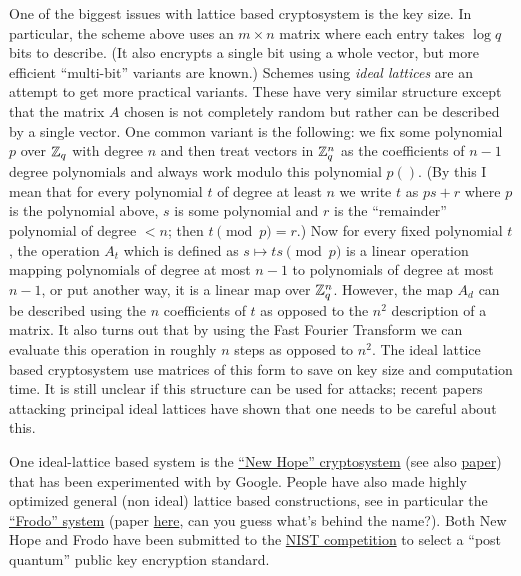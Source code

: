 One of the biggest issues with lattice based cryptosystem is the key
size. In particular, the scheme above uses an \(m\times n\) matrix where
each entry takes \(\log q\) bits to describe. (It also encrypts a single
bit using a whole vector, but more efficient ``multi-bit'' variants are
known.) Schemes using \emph{ideal lattices} are an attempt to get more
practical variants. These have very similar structure except that the
matrix \(A\) chosen is not completely random but rather can be described
by a single vector. One common variant is the following: we fix some
polynomial \(p\) over \({\mathbb{Z}}_q\) with degree \(n\) and then treat vectors
in \({\mathbb{Z}}_q^n\) as the coefficients of \(n-1\) degree polynomials and
always work modulo this polynomial \(p()\). (By this I mean that for
every polynomial \(t\) of degree at least \(n\) we write \(t\) as
\(ps+r\) where \(p\) is the polynomial above, \(s\) is some polynomial
and \(r\) is the ``remainder'' polynomial of degree \(<n\); then
\(t \pmod{p} = r\).) Now for every fixed polynomial \(t\), the operation
\(A_t\) which is defined as \(s \mapsto ts \pmod{p}\) is a linear
operation mapping polynomials of degree at most \(n-1\) to polynomials
of degree at most \(n-1\), or put another way, it is a linear map over
\({\mathbb{Z}}_q^n\). However, the map \(A_d\) can be described using the \(n\)
coefficients of \(t\) as opposed to the \(n^2\) description of a matrix.
It also turns out that by using the Fast Fourier Transform we can
evaluate this operation in roughly \(n\) steps as opposed to \(n^2\).
The ideal lattice based cryptosystem use matrices of this form to save
on key size and computation time. It is still unclear if this structure
can be used for attacks; recent papers attacking principal ideal
lattices have shown that one needs to be careful about this.

One ideal-lattice based system is the
\href{https://newhopecrypto.org/}{``New Hope'' cryptosystem} (see also
\href{https://eprint.iacr.org/2015/1092.pdf}{paper}) that has been
experimented with by Google. People have also made highly optimized
general (non ideal) lattice based constructions, see in particular the
\href{https://frodokem.org/}{``Frodo'' system} (paper
\href{https://eprint.iacr.org/2016/659}{here}, can you guess what's
behind the name?). Both New Hope and Frodo have been submitted to the
\href{https://csrc.nist.gov/Projects/Post-Quantum-Cryptography}{NIST
competition} to select a ``post quantum'' public key encryption
standard.
